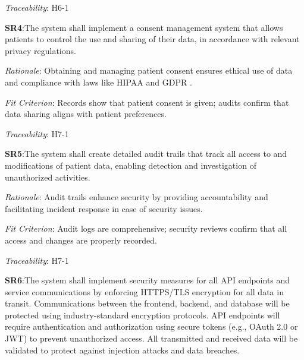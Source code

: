 \documentclass{article}
\begin{document}
\vspace{0.2cm}

\emph{Traceability}: H6-1

\vspace{0.5cm}

\textbf{SR4}:\hypertarget{SR4}{The system shall implement a consent management system that allows patients to control the use and sharing of their data, in accordance with relevant privacy regulations.}
\vspace{0.2cm}

\emph{Rationale}: Obtaining and managing patient consent ensures ethical use of data and compliance with laws like HIPAA \cite{HIPAA} and GDPR \cite{GDPR}.

\vspace{0.2cm}

\emph{Fit Criterion}: Records show that patient consent is given; audits confirm that data sharing aligns with patient preferences.

\vspace{0.2cm}

\emph{Traceability}: H7-1

\vspace{0.5cm}

\textbf{SR5}:\hypertarget{SR5}{The system shall create detailed audit trails that track all access to and modifications of patient data, enabling detection and investigation of unauthorized activities.}
\vspace{0.2cm}

\emph{Rationale}: Audit trails enhance security by providing accountability and facilitating incident response in case of security issues.

\vspace{0.2cm}

\emph{Fit Criterion}: Audit logs are comprehensive; security reviews confirm that all access and changes are properly recorded.

\vspace{0.2cm}

\emph{Traceability}: H7-1

\vspace{0.5cm}

\textbf{SR6}:\hypertarget{SR5}{The system shall implement security measures for all API endpoints and service communications by enforcing HTTPS/TLS encryption for all data in transit. Communications between the frontend, backend, and database will be protected using industry-standard encryption protocols. API endpoints will require authentication and authorization using secure tokens (e.g., OAuth 2.0 or JWT) to prevent unauthorized access. All transmitted and received data will be validated to protect against injection attacks and data breaches.
}
\end{document}
